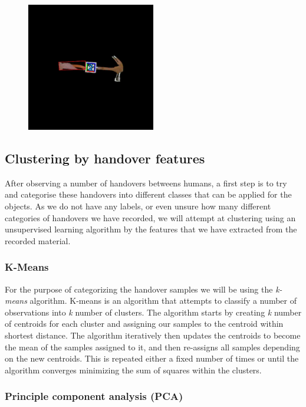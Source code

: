 \begin{figure}
	\centering
	\includegraphics[width=0.5\textwidth]{img/methods/handovers/incorr_mask.jpg}
	\caption{}
	\label{fig:handover_incorr_masked}
\end{figure}


\subsection{Clustering by handover features}

After observing a number of handovers betweens humans, a first step is to try and categorise these handovers into different classes that can be applied for the objects. As we do not have any labels, or even unsure how many different categories of handovers we have recorded, we will attempt at clustering using an unsupervised learning algorithm by the features that we have extracted from the recorded material.

\subsubsection{K-Means}

For the purpose of categorizing the handover samples we will be using the \emph{k-means} algorithm. K-means is an algorithm that attempts to classify a number of observations into \emph{k} number of clusters. The algorithm starts by creating \emph{k} number of centroids for each cluster and assigning our samples to the centroid within shortest distance. The algorithm iteratively then updates the centroids to become the mean of the samples assigned to it, and then re-assigns all samples depending on the new centroids. This is repeated either a fixed number of times or until the algorithm converges minimizing the sum of squares within the clusters.

\subsubsection{Principle component analysis (PCA)}

